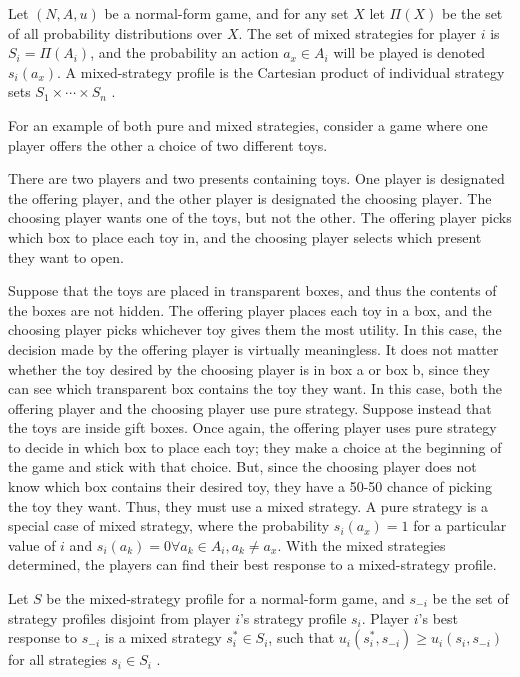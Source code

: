 \begin{define}
  Let $(N,A,u)$ be a normal-form game, and for any set $X$ let $\Pi(X)$ be the set of all probability distributions over $X$. The set of mixed strategies for player $i$ is $S_i = \Pi(A_i)$, and the probability an action $a_x\in A_i$ will be played is denoted $s_i(a_x)$. A mixed-strategy profile is the Cartesian product of individual strategy sets $S_1\times\cdots\times S_n$ \cite{shoh09}.
\end{define}

For an example of both pure and mixed strategies, consider a game where one player offers the other a choice of two different toys.

\begin{exmp}
  There are two players and two presents containing toys. One player is designated the offering player, and the other player is designated the choosing player. The choosing player wants one of the toys, but not the other. The offering player picks which box to place each toy in, and the choosing player selects which present they want to open.
\end{exmp}

Suppose that the toys are placed in transparent boxes, and thus the contents of the boxes are not hidden. The offering player places each toy in a box, and the choosing player picks whichever toy gives them the most utility. In this case, the decision made by the offering player is virtually meaningless. It does not matter whether the toy desired by the choosing player is in box a or box b, since they can see which transparent box contains the toy they want. In this case, both the offering player and the choosing player use pure strategy. Suppose instead that the toys are inside gift boxes. Once again, the offering player uses pure strategy to decide in which box to place each toy; they make a choice at the beginning of the game and stick with that choice. But, since the choosing player does not know which box contains their desired toy, they have a 50-50 chance of picking the toy they want. Thus, they must use a mixed strategy. A pure strategy is a special case of mixed strategy, where the probability $s_i(a_x)=1$ for a particular value of $i$ and $s_i(a_k)=0 \forall a_k\in A_i, a_k \neq a_x$. With the mixed strategies determined, the players can find their best response to a mixed-strategy profile.

\begin{define}
  Let $S$ be the mixed-strategy profile for a normal-form game, and $s_{-i}$ be the set of strategy profiles disjoint from player $i$'s strategy profile $s_i$. Player $i$'s best response to $s_{-i}$ is a mixed strategy $s_i^*\in S_i$, such that $u_i(s_i^*,s_{-i}) \ge u_i(s_i, s_{-i})$ for all strategies $s_i\in S_i$ \cite{shoh09}.
\end{define}


